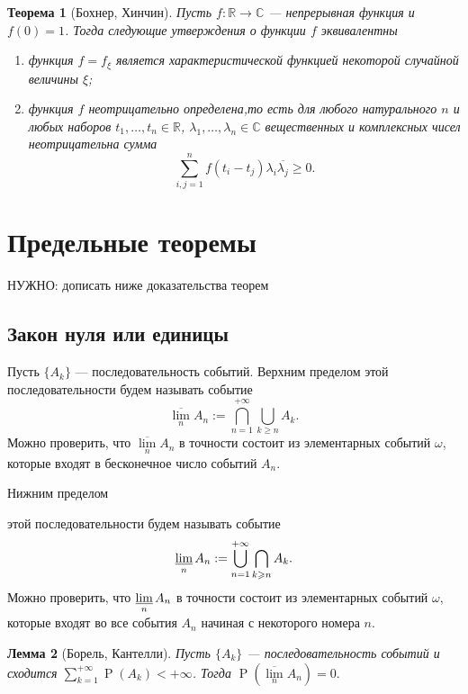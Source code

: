 \documentclass[12pt]{article}
\newtheorem{theorem}{Теорема}
\newtheorem{lemma}[theorem]{Лемма}
\numberwithin{theorem}{section}
\theoremstyle{definition}
\newcommand{\defin}[2]{\hypertarget{#2}{{\color{red} #1}}}
\newcommand{\CC}{\mathbb{C}}
\newcommand{\RR}{\mathbb{R}}
\newcommand{\prob}{\operatorname{P}}
\newcommand{\TODO}[1]{\textcolor{todocolor}{НУЖНО: #1}}
\begin{document}
	\begin{theorem}[Бохнер, Хинчин]
		Пусть $ f \colon \RR \to \CC $ --- непрерывная функция и $ f(0) = 1 $.
		Тогда следующие утверждения о функции $ f $ эквивалентны
		\begin{enumerate}
			\item функция $ f = f_\xi $ является характеристической функцией некоторой случайной величины $ \xi $;
			\item функция $ f $ неотрицательно определена,то есть для любого натурального $ n $
			и любых наборов $ t_1, \ldots, t_n \in \RR $, $ \lambda_1, \ldots, \lambda_n \in \CC $
			вещественных и комплексных чисел неотрицательна
			сумма 
			$$ \sum\limits_{i,j = 1}^{n} f(t_i - t_j)\lambda_i\overline{\lambda_j} \geqslant 0. $$
		\end{enumerate}
	\end{theorem}
	
	\section{Предельные теоремы}
	
	\TODO{дописать ниже доказательства теорем}
	
	\subsection{Закон нуля или единицы}
	
	Пусть $ \{A_k\} $ --- последовательность событий.
	\defin{Верхним пределом}{suplim} этой последовательности будем называть событие
	$$ \overline{\lim\limits_{n}} A_n := \bigcap\limits_{n = 1}^{+\infty} \bigcup\limits_{k \geqslant n} A_k. $$
	Можно проверить, что $ \overline{\lim\limits_{n}} A_n $ в точности состоит из элементарных событий $ \omega $,
	которые входят в бесконечное число событий $ A_n $.
	
	\defin{Нижним пределом}{inflim} этой последовательности будем называть событие
	$$ \varliminf\limits_{n} A_n := \bigcup\limits_{n = 1}^{+\infty} \bigcap\limits_{k \geqslant n} A_k. $$
	Можно проверить, что $ \varliminf\limits_{n} A_n $ в точности состоит из элементарных событий $ \omega $,
	которые входят во все события $ A_n $ начиная с некоторого номера $ n $.
	
	\begin{lemma}[Борель, Кантелли]
		Пусть $ \{A_k\} $ --- последовательность событий
		и сходится $ \sum\limits_{k = 1}^{+\infty}\prob (A_k) < +\infty $.
		Тогда $ \prob(\overline{\lim\limits_{n}} A_n) = 0. $
	\end{lemma}
	
\end{document}
